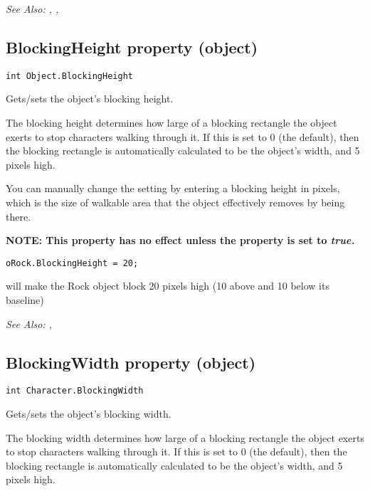 \it{See Also:} ,
,


\subsection{BlockingHeight property (object)}\label{Object.BlockingHeight}%

\begin{verbatim}
int Object.BlockingHeight
\end{verbatim}
Gets/sets the object's blocking height.

The blocking height determines how large of a blocking rectangle the object exerts to
stop characters walking through it. If this is set to 0 (the default), then the
blocking rectangle is automatically calculated to be the object's width, and 5 pixels
high.

You can manually change the setting by entering a blocking height in pixels, which is the
size of walkable area that the object effectively removes by being there.

\bf{NOTE:} This property has no effect unless the  property
is set to \it{true}.

\begin{verbatim}
oRock.BlockingHeight = 20;
\end{verbatim}
will make the Rock object block 20 pixels high (10 above and 10 below its baseline)

\it{See Also:} ,


\subsection{BlockingWidth property (object)}\label{Object.BlockingWidth}%

\begin{verbatim}
int Character.BlockingWidth
\end{verbatim}
Gets/sets the object's blocking width.

The blocking width determines how large of a blocking rectangle the object exerts to
stop characters walking through it. If this is set to 0 (the default), then the
blocking rectangle is automatically calculated to be the object's width, and 5 pixels
high.

